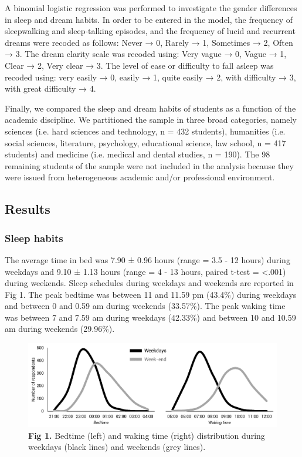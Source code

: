 A binomial logistic regression was performed to investigate the gender differences in sleep and dream habits. In order to be entered in the model, the frequency of sleepwalking and sleep-talking episodes, and the frequency of lucid and recurrent dreams were recoded as follows: Never → 0, Rarely → 1, Sometimes → 2, Often → 3. The dream clarity scale was recoded using: Very vague → 0, Vague → 1, Clear → 2, Very clear → 3.  The level of ease or difficulty to fall asleep was recoded using: very easily → 0, easily → 1, quite easily → 2, with difficulty → 3, with great difficulty → 4.

Finally, we compared the sleep and dream habits of students as a function of the academic discipline. We partitioned the sample in three broad categories, namely sciences (i.e. hard sciences and technology, n = 432 students), humanities (i.e. social sciences, literature, psychology, educational science, law school, n = 417 students) and medicine (i.e. medical and dental studies, n = 190). The 98 remaining students of the sample were not included in the analysis because they were issued from heterogeneous academic and/or professional environment.

\subsection*{Results}
\label{res:survey:results}

\subsubsection*{Sleep habits}
The average time in bed was 7.90 ± 0.96 hours (range = 3.5 - 12 hours) during weekdays and 9.10 ± 1.13 hours (range = 4 - 13 hours, paired t-test = <.001) during weekends. Sleep schedules during weekdays and weekends are reported in Fig 1. The peak bedtime was between 11 and 11.59 pm (43.4\%) during weekdays and between 0 and 0.59 am during weekends (33.57\%). The peak waking time was between 7 and 7.59 am during weekdays (42.33\%) and between 10 and 10.59 am during weekends (29.96\%).

\begin{figure}[htb]
	\includegraphics[width=\textwidth]{Fig/Results/Survey/Fig1.png}
	\caption*{\textbf{Fig 1.} Bedtime (left) and waking time (right) distribution during weekdays (black lines) and weekends (grey lines).}
\end{figure}

